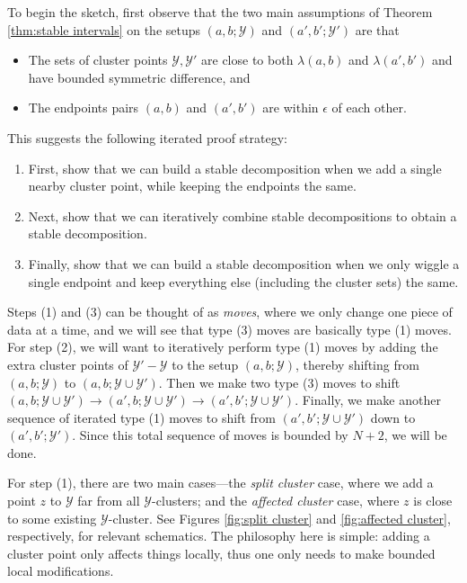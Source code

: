 \documentclass{amsart}
\theoremstyle{definition}
\theoremstyle{remark}
\theoremstyle{definition}
\newcommand{\calY}{\mathcal{Y}}
\begin{document}
To begin the sketch, first observe that the two main assumptions of Theorem \ref{thm:stable intervals} on the setups $(a,b;\calY)$ and $(a',b';\calY')$ are that
\begin{itemize}
\item The sets of cluster points $\calY, \calY'$ are close to both $\lambda(a,b)$ and $\lambda(a',b')$ and have bounded symmetric difference, and 
\item The endpoints pairs $(a,b)$ and $(a',b')$ are within $\epsilon$ of each other.
\end{itemize}

This suggests the following iterated proof strategy: 
\begin{enumerate}
\item First, show that we can build a stable decomposition when we add a single nearby cluster point, while keeping the endpoints the same.
\item Next, show that we can iteratively combine stable decompositions to obtain a stable decomposition.
\item Finally, show that we can build a stable decomposition when we only wiggle a single endpoint and keep everything else (including the cluster sets) the same.

\end{enumerate}

Steps (1) and (3) can be thought of as \emph{moves}, where we only change one piece of data at a time, and we will see that type (3) moves are basically type (1) moves.  For step (2), we will want to iteratively perform type (1) moves by adding the extra cluster points of $\calY' - \calY$ to the setup $(a,b;\calY)$, thereby shifting from $(a,b;\calY)$ to $(a,b;\calY \cup \calY')$.  Then we make two type (3) moves to shift $(a,b;\calY \cup \calY') \to (a',b;\calY \cup \calY') \to (a',b';\calY \cup \calY')$.  Finally, we make another sequence of iterated type (1) moves to shift from $(a',b';\calY \cup \calY')$ down to $(a',b';\calY')$.  Since this total sequence of moves is bounded by $N+2$, we will be done.

For step (1), there are two main cases---the \emph{split cluster} case, where we add a point $z$ to $\calY$ far from all $\calY$-clusters; and the \emph{affected cluster} case, where $z$ is close to some existing $\calY$-cluster.  See Figures \ref{fig:split cluster} and \ref{fig:affected cluster}, respectively, for relevant schematics.  The philosophy here is simple: adding a cluster point only affects things locally, thus one only needs to make bounded local modifications.
\end{document}
